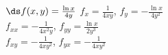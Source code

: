 {$\ds f(x,y) =\frac{\ln x}{4y}$}
{$f_x=\frac{1}{4xy}$, $f_y=-\frac{\ln x}{4y^2}$\\
$f_{xx}=-\frac{1}{4x^2y}$, $f_{yy}=\frac{\ln x}{2y^3}$\\
$f_{xy}=-\frac{1}{4xy^2}$, $f_{yx}=-\frac{1}{4xy^2}$\\
}